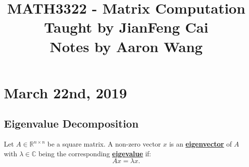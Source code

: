 \documentclass[12pt]{article}
\title{
	{\LARGE MATH3322 - Matrix Computation} \\
	\textbf{\large Taught by JianFeng Cai}\\ 
	\textbf{\large Notes by Aaron Wang}\\ 
}
\date{}
\theoremstyle{definition}
\theoremstyle{remark}
\newcommand{\R}{\mathbb{R}}
\newcommand{\C}{\mathbb{C}}
\begin{document}
\maketitle\thispagestyle{fancy}
\tableofcontents
\newpage

\section{March 22nd, 2019}
\subsection{Eigenvalue Decomposition}

		Let $A \in \R^{n\times n}$ be a square matrix. A non-zero vector $x$ is an \underline{\textbf{eigenvector}} of $A$ with  $\lambda\in \C$ being the corresponding \underline{\textbf{eigevalue}} if: \[
		Ax=\lambda x		.\]  	
\end{document}
